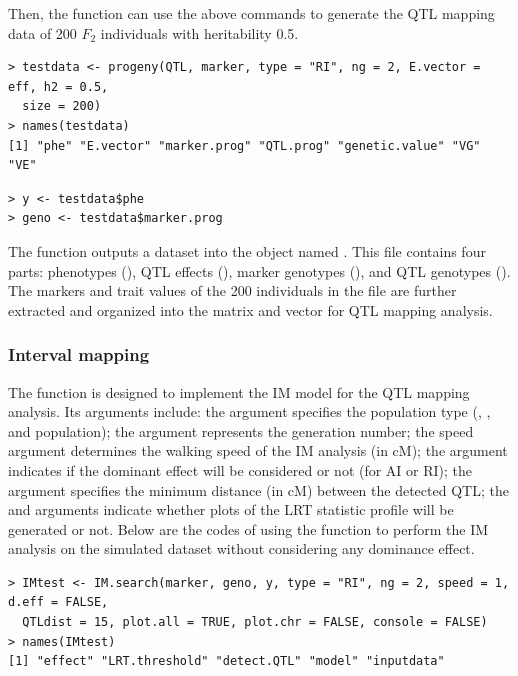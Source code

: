 \noindent Then, the  function can use the above commands to generate the QTL mapping data of 200 $F_2$ individuals with heritability 0.5.

\begin{verbatim}
> testdata <- progeny(QTL, marker, type = "RI", ng = 2, E.vector = eff, h2 = 0.5, 
  size = 200)
> names(testdata)
[1] "phe" "E.vector" "marker.prog" "QTL.prog" "genetic.value" "VG" "VE"
\end{verbatim}

\begin{verbatim}
> y <- testdata$phe
> geno <- testdata$marker.prog
\end{verbatim}

\noindent The  function outputs a dataset into the object named . This file contains four parts: phenotypes (), QTL effects (), marker genotypes (), and QTL genotypes (). The markers and trait values of the 200 individuals in the  file are further extracted and organized into the  matrix and  vector for QTL mapping analysis.

\subsubsection{Interval mapping} \label{3.2.2}

The  function is designed to implement the IM model for the QTL mapping analysis. Its arguments include: the  argument specifies the population type (, , and  population); the  argument represents the generation number; the speed argument determines the walking speed of the IM analysis (in cM); the  argument indicates if the dominant effect will be considered or not (for AI or RI); the  argument specifies the minimum distance (in cM) between the detected QTL; the  and  arguments indicate whether plots of the LRT statistic profile will be generated or not. Below are the codes of using the  function to perform the IM analysis on the simulated dataset without considering any dominance effect.

\begin{verbatim}
> IMtest <- IM.search(marker, geno, y, type = "RI", ng = 2, speed = 1, d.eff = FALSE, 
  QTLdist = 15, plot.all = TRUE, plot.chr = FALSE, console = FALSE)
> names(IMtest)
[1] "effect" "LRT.threshold" "detect.QTL" "model" "inputdata"  
\end{verbatim}

